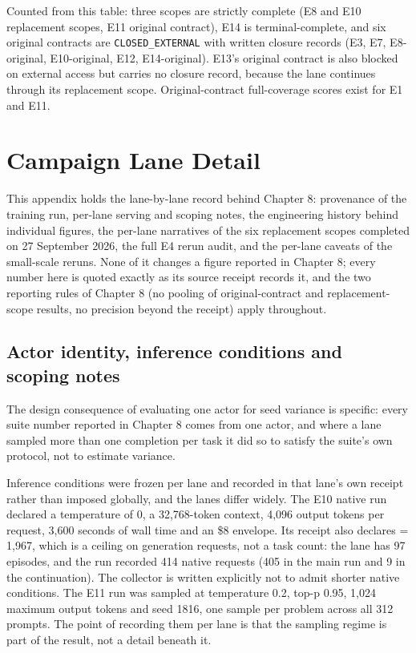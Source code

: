 \documentclass[12pt,a4paper]{report}
\newcommand{\longtok}[1]{\texttt{\seqsplit{#1}}}
\begin{document}
Counted from this table: three scopes are strictly complete (E8 and E10
replacement scopes, E11 original contract), E14 is terminal-complete,
and six original contracts are \texttt{CLOSED\_EXTERNAL} with written
closure records (E3, E7, E8-original, E10-original, E12, E14-original).
E13's original contract is also blocked on external access but carries
no closure record, because the lane continues through its replacement
scope. Original-contract full-coverage scores exist for E1 and E11.



\chapter{Campaign Lane Detail}\label{campaign-lane-detail}

This appendix holds the lane-by-lane record behind Chapter 8: provenance
of the training run, per-lane serving and scoping notes, the engineering
history behind individual figures, the per-lane narratives of the six
replacement scopes completed on 27 September 2026, the full E4 rerun
audit, and the per-lane caveats of the small-scale reruns. None of it
changes a figure reported in Chapter 8; every number here is quoted
exactly as its source receipt records it, and the two reporting rules of
Chapter 8 (no pooling of original-contract and replacement-scope
results, no precision beyond the receipt) apply throughout.

\section{Actor identity, inference conditions and scoping
notes}\label{actor-identity-inference-conditions-and-scoping-notes}

The design consequence of evaluating one actor for seed variance is
specific: every suite number reported in Chapter 8 comes from one actor,
and where a lane sampled more than one completion per task it did so to
satisfy the suite's own protocol, not to estimate variance.

Inference conditions were frozen per lane and recorded in that lane's
own receipt rather than imposed globally, and the lanes differ widely.
The E10 native run declared a temperature of 0, a 32,768-token context,
4,096 output tokens per request, 3,600 seconds of wall time and an \$8
envelope. Its receipt also declares \longtok{max\_\allowbreak{}generation\_\allowbreak{}requests} =
1,967, which is a ceiling on generation requests, not a task count: the
lane has 97 episodes, and the run recorded 414 native requests (405 in
the main run and 9 in the continuation). The collector is written
explicitly not to admit shorter native conditions. The E11 run was
sampled at temperature 0.2, top-p 0.95, 1,024 maximum output tokens and
seed 1816, one sample per problem across all 312 prompts. The point of
recording them per lane is that the sampling regime is part of the
result, not a detail beneath it.
\end{document}
